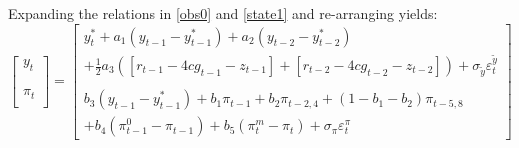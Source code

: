\documentclass[a4paper,12pt]{article}
\begin{document}
\pagebreak

Expanding the relations in \ref{obs0} and \ref{state1} and re-arranging
yields:%
\begin{equation}
\begin{bmatrix}
y_{t} \\ 
\\ 
\\ 
\pi _{t} \\ 
\end{bmatrix}%
=%
\begin{bmatrix}
y_{t}^{\ast }+a_{1}\left( y_{t-1}-y_{t-1}^{\ast }\right) +a_{2}\left(
y_{t-2}-y_{t-2}^{\ast }\right) \\ 
+\frac{1}{2}a_{3}\left( \left[ r_{t-1}-4cg_{t-1}-z_{t-1}\right] +\left[
r_{t-2}-4cg_{t-2}-z_{t-2}\right] \right) +\sigma _{\tilde{y}}\varepsilon
_{t}^{\tilde{y}} \\ 
\\ 
b_{3}\left( y_{t-1}-y_{t-1}^{\ast }\right) +b_{1}\pi _{t-1}+b_{2}\pi
_{t-2,4}+\left( 1-b_{1}-b_{2}\right) \pi _{t-5,8} \\ 
+b_{4}\left( \pi _{t-1}^{0}-\pi _{t-1}\right) +b_{5}\left( \pi _{t}^{m}-\pi
_{t}\right) +\sigma _{\pi }\varepsilon _{t}^{\pi }%
\end{bmatrix}
\label{lwa}
\end{equation}
\end{document}
